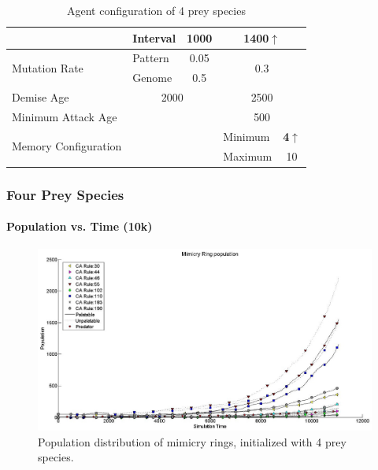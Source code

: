 {\begin{table}
\begin{tiny}
\begin{spacing}{1.5}
\begin{tabular}{|l|l|c|c|l|c|}
	  						 									& Interval  & \multicolumn{2}{c|}{1000} & \multicolumn{2}{c|}{\textbf{1400\(\uparrow\)}} \\ \hline
	  \multirow{2}{*}{Mutation Rate} & Pattern   & \multicolumn{2}{c|}{0.05} & \multicolumn{2}{c|}{\multirow{2}{*}{0.3}} \\ \cline{2-4}
	  						 									 & Genome    & \multicolumn{2}{c|}{0.5}  & \multicolumn{2}{c|}{} \\ \hline
	  Demise Age	 									 & \multicolumn{3}{c|}{2000}							& \multicolumn{2}{c|}{2500} \\ \hline
	  Minimum Attack Age						 & \multicolumn{3}{c|}{} 						    & \multicolumn{2}{c|}{500} \\ \hline
	  \multirow{2}{*}{Memory Configuration} & \multicolumn{3}{c|}{} 					& Minimum & \textbf{4\(\uparrow\)} \\ \cline{5-6}
	   																			& \multicolumn{3}{c|}{} 					& Maximum & 10 \\ \hline  
	\end{tabular}
	\end{spacing}
	\end{tiny}
	\caption{Agent configuration of 4 prey species}
	\label{tab:config-table-4-prey}
	\end{table}
}

\frame
{
	\frametitle{Four Prey Species}
	\framesubtitle{Population vs. Time (10k)}

	\begin{figure}
		\centering
		\includegraphics[scale=0.25]{../tex/images/simTime10k-4Prey}
		\caption{Population distribution of mimicry rings, initialized with 4 prey species.}
		\label{fig:plot-4-prey}
	\end{figure}
}

